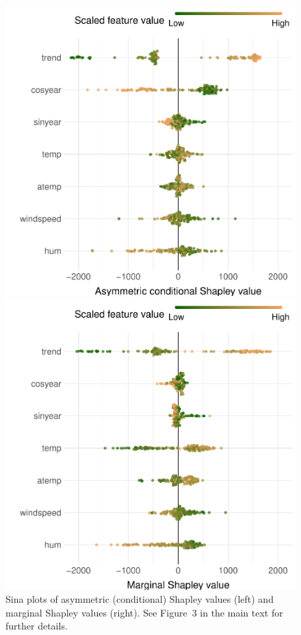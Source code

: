\documentclass{article}
\begin{document}
\begin{figure}[t]
	\centering
	\begin{minipage}{.49\linewidth}
	\includegraphics[width=\textwidth]{figures/sina_plot_asymmetric.pdf}
	\end{minipage}
	\begin{minipage}{.49\linewidth}
	\includegraphics[width=\textwidth]{figures/sina_plot_marginal.pdf}
	\end{minipage}
	\caption{Sina plots of asymmetric (conditional) Shapley values (left) and marginal Shapley values (right). See Figure~3 in the main text for further details.}
	\label{fig:sinaplots}
\end{figure}



\end{document}
